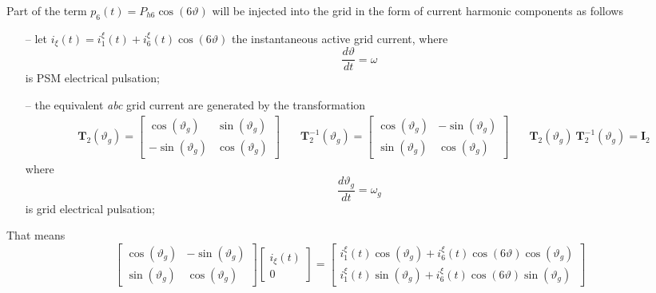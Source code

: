 \documentclass[12pt,a4paper]{scrartcl}
\begin{document}
\begin{onehalfspace}
Part of the term $p_6(t) = P_{h6}\cos(6\vartheta)$ will be injected into the grid in the form of current harmonic components as follows
\begin{itemize}
	\item[--] let $i_\xi(t) = i_1^\xi(t) + i_6^\xi(t)\cos(6\vartheta)$ the instantaneous active grid current, where 
	\begin{equation}
		\frac{d\vartheta}{dt} = \omega
	\end{equation} is PSM electrical pulsation;  
	\item[--] the equivalent \textit{abc} grid current are generated by the transformation 
	\begin{equation}
		\begin{aligned}
			& \mathbf{T}_2(\vartheta_g) = 
			\begin{bmatrix}
				\cos(\vartheta_g) & \sin(\vartheta_g) \\[6pt]
				-\sin(\vartheta_g) & \cos(\vartheta_g) 
			\end{bmatrix} \quad
			& \mathbf{T}_2^{-1}(\vartheta_g) = 
			\begin{bmatrix}
				\cos(\vartheta_g) & -\sin(\vartheta_g) \\[6pt]
				\sin(\vartheta_g) & \cos(\vartheta_g) 
			\end{bmatrix} \quad
			& \mathbf{T}_2(\vartheta_g) \ \mathbf{T}_2^{-1}(\vartheta_g)= \mathbf{I}_2
		\end{aligned} 
		\end{equation} where \begin{equation}\frac{d\vartheta_g}{dt} = \omega_g\end{equation} is grid electrical pulsation;  
\end{itemize}
That means
\begin{equation}
	\begin{bmatrix}
		\cos(\vartheta_g) & -\sin(\vartheta_g) \\[6pt]
		\sin(\vartheta_g) & \cos(\vartheta_g) 
	\end{bmatrix}
	\begin{bmatrix}
		i_\xi(t) \\[6pt]
		0 
	\end{bmatrix} = 
	\begin{bmatrix}
		i_1^\xi(t)\cos(\vartheta_g) + i_6^\xi(t)\cos(6\vartheta)\cos(\vartheta_g) \\[6pt]
		i_1^\xi(t)\sin(\vartheta_g) + i_6^\xi(t)\cos(6\vartheta)\sin(\vartheta_g)
	\end{bmatrix}
\end{equation}

\end{onehalfspace}
\end{document}
